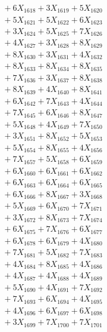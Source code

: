 \documentclass[a4paper,10pt]{article}
\begin{document}
{\begin{align}
&\;  + 6 X_{1618} + 3 X_{1619} + 5 X_{1620} \\[0.3ex]
&\;  + 5 X_{1621} + 5 X_{1622} + 6 X_{1623} \\[0.3ex]
&\;  + 3 X_{1624} + 5 X_{1625} + 7 X_{1626} \\[0.3ex]
&\;  + 4 X_{1627} + 3 X_{1628} + 8 X_{1629} \\[0.5ex]\allowbreak
&\;  + 8 X_{1630} + 3 X_{1631} + 4 X_{1632} \\[0.3ex]
&\;  + 8 X_{1633} + 8 X_{1634} + 8 X_{1635} \\[0.3ex]
&\;  + 7 X_{1636} + 3 X_{1637} + 8 X_{1638} \\[0.3ex]
&\;  + 8 X_{1639} + 4 X_{1640} + 8 X_{1641} \\[0.3ex]
&\;  + 6 X_{1642} + 7 X_{1643} + 4 X_{1644} \\[0.3ex]
&\;  + 7 X_{1645} + 6 X_{1646} + 8 X_{1647} \\[0.3ex]
&\;  + 5 X_{1648} + 4 X_{1649} + 7 X_{1650} \\[0.3ex]
&\;  + 3 X_{1651} + 8 X_{1652} + 5 X_{1653} \\[0.3ex]
&\;  + 5 X_{1654} + 8 X_{1655} + 4 X_{1656} \\[0.3ex]
&\;  + 7 X_{1657} + 5 X_{1658} + 6 X_{1659} \\[0.5ex]\allowbreak
&\;  + 6 X_{1660} + 6 X_{1661} + 6 X_{1662} \\[0.3ex]
&\;  + 6 X_{1663} + 6 X_{1664} + 6 X_{1665} \\[0.3ex]
&\;  + 6 X_{1666} + 8 X_{1667} + 3 X_{1668} \\[0.3ex]
&\;  + 5 X_{1669} + 6 X_{1670} + 7 X_{1671} \\[0.3ex]
&\;  + 3 X_{1672} + 8 X_{1673} + 7 X_{1674} \\[0.3ex]
&\;  + 6 X_{1675} + 7 X_{1676} + 6 X_{1677} \\[0.3ex]
&\;  + 6 X_{1678} + 6 X_{1679} + 4 X_{1680} \\[0.3ex]
&\;  + 7 X_{1681} + 5 X_{1682} + 7 X_{1683} \\[0.3ex]
&\;  + 4 X_{1684} + 8 X_{1685} + 4 X_{1686} \\[0.3ex]
&\;  + 4 X_{1687} + 4 X_{1688} + 4 X_{1689} \\[0.5ex]\allowbreak
&\;  + 5 X_{1690} + 4 X_{1691} + 7 X_{1692} \\[0.3ex]
&\;  + 7 X_{1693} + 6 X_{1694} + 4 X_{1695} \\[0.3ex]
&\;  + 4 X_{1696} + 6 X_{1697} + 6 X_{1698} \\[0.3ex]
&\;  + 3 X_{1699} + 7 X_{1700} + 7 X_{1701} \\[0.3ex]

\end{align}}
\end{document}
